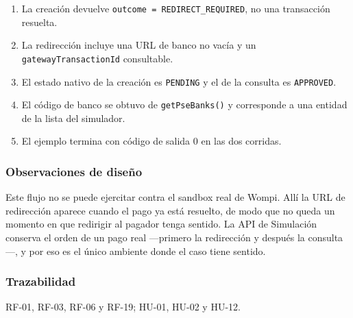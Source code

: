 \begin{enumerate}
  \item La creación devuelve \texttt{outcome = REDIRECT\_REQUIRED}, no una transacción resuelta.
  \item La redirección incluye una URL de banco no vacía y un \texttt{gatewayTransactionId} consultable.
  \item El estado nativo de la creación es \texttt{PENDING} y el de la consulta es \texttt{APPROVED}.
  \item El código de banco se obtuvo de \texttt{getPseBanks()} y corresponde a una entidad de la lista del simulador.
  \item El ejemplo termina con código de salida 0 en las dos corridas.
\end{enumerate}

\subsubsection{Observaciones de diseño}

Este flujo no se puede ejercitar contra el sandbox real de Wompi. Allí la URL de redirección aparece cuando el pago ya está resuelto, de modo que no queda un momento en que redirigir al pagador tenga sentido. La API de Simulación conserva el orden de un pago real ---primero la redirección y después la consulta---, y por eso es el único ambiente donde el caso tiene sentido.

\subsubsection{Trazabilidad}

RF-01, RF-03, RF-06 y RF-19; HU-01, HU-02 y HU-12.

